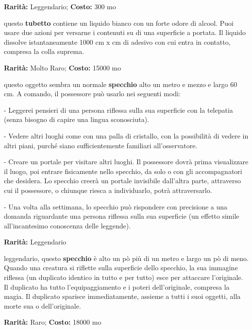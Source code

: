 \begin{multicols}{2}

\textbf{Rarità:} Leggendario; \textbf{Costo:} 300 mo

questo \textbf{tubetto} contiene un liquido bianco con un forte odore di alcool. Puoi usare due azioni per versarne i contenuti su di una superficie a portata. Il liquido dissolve istantaneamente 1000 cm x cm di adesivo con cui entra in contatto, compresa la colla suprema.


\textbf{Rarità:} Molto Raro; \textbf{Costo:} 15000 mo

questo oggetto sembra un normale \textbf{specchio} alto un metro e mezzo e largo 60 cm. A comando, il possessore può usarlo nei seguenti modi:

- Leggerei pensieri di una persona riflessa sulla sua superficie con la telepatia (senza bisogno di capire una lingua sconosciuta).

- Vedere altri luoghi come con una palla di cristallo, con la possibilità di vedere in altri piani, purché siano sufficientemente familiari all'osservatore.

- Creare un portale per visitare altri luoghi. Il possessore dovrà prima visualizzare il luogo, poi entrare fisicamente nello specchio, da solo o con gli accompagnatori che desidera. Lo specchio creerà un portale invisibile dall'altra parte, attraverso cui il possessore, o chiunque riesca a individuarlo, potrà attraversarlo.

- Una volta alla settimana, lo specchio può rispondere con precisione a una domanda riguardante una persona riflessa sulla sua superficie (un effetto simile all'incantesimo conoscenza delle leggende).


\textbf{Rarità:} Leggendario

leggendario, questo \textbf{specchio} è alto un pò più di un metro e largo un pò di meno. Quando una creatura si riflette sulla superficie dello specchio, la sua immagine riflessa (un duplicato identico in tutto e per tutto) esce per attaccare l'originale. Il duplicato ha tutto l'equipaggiamento e i poteri dell'originale, compresa la magia. Il duplicato sparisce immediatamente, assieme a tutti i suoi oggetti, alla morte sua o dell'originale.


\textbf{Rarità:} Raro; \textbf{Costo:} 18000 mo


\end{multicols}
